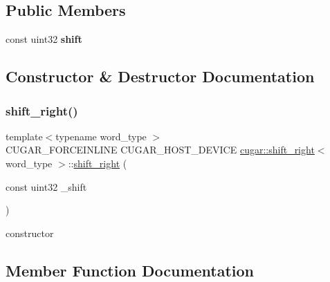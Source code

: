 \subsection*{Public Members}
\begin{DoxyCompactItemize}
\item 
\mbox{\label{structcugar_1_1shift__right_a2fd97263240aa228a1aa6f1ff4e70646}} 
const uint32 {\bfseries shift}
\end{DoxyCompactItemize}


\subsection{Constructor \& Destructor Documentation}
\mbox{\label{structcugar_1_1shift__right_a803343d3bc4cac61aba433baec3276d5}} 
\subsubsection{\texorpdfstring{shift\+\_\+right()}{shift\_right()}}
{\footnotesize\ttfamily template$<$typename word\+\_\+type $>$ \\
C\+U\+G\+A\+R\+\_\+\+F\+O\+R\+C\+E\+I\+N\+L\+I\+NE C\+U\+G\+A\+R\+\_\+\+H\+O\+S\+T\+\_\+\+D\+E\+V\+I\+CE \hyperlink{structcugar_1_1shift__right}{cugar\+::shift\+\_\+right}$<$ word\+\_\+type $>$\+::\hyperlink{structcugar_1_1shift__right}{shift\+\_\+right} (\begin{DoxyParamCaption}\item[{const uint32}]{\+\_\+shift }\end{DoxyParamCaption})\hspace{0.3cm}{\ttfamily [inline]}}

constructor 

\subsection{Member Function Documentation}
\mbox{\label{structcugar_1_1shift__right_a2c88a2717a9bd1ece9fd595835beaed7}} 
